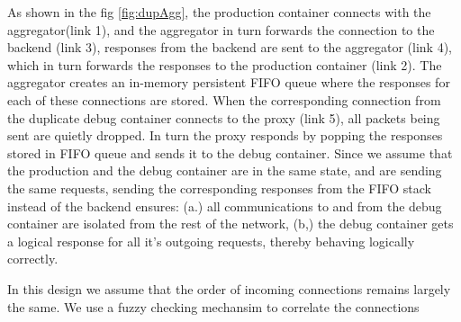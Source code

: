 As shown in the fig \ref{fig:dupAgg}, the production container connects with the aggregator(link 1), and the aggregator in turn forwards the connection to the backend (link 3), responses from the backend are sent to the aggregator (link 4), which in turn forwards the responses to the production container (link 2).
The aggregator creates an in-memory persistent FIFO queue where the responses for each of these connections are stored.
When the corresponding connection from the duplicate debug container connects to the proxy (link 5), all packets being sent are quietly dropped.
In turn the proxy responds by popping the responses stored in FIFO queue and sends it to the debug container.
Since we assume that the production and the debug container are in the same state, and are sending the same requests, sending the corresponding responses from the FIFO stack instead of the backend ensures: (a.) all communications to and from the debug container are isolated from the rest of the network, (b,) the debug container gets a logical response for all it's outgoing requests, thereby behaving logically correctly.

In this design we assume that the order of incoming connections remains largely the same.
We use a fuzzy checking mechansim to correlate the connections

